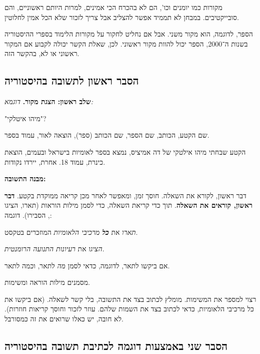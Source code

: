 \documentclass[a4paper]{book}
\begin{document}
	מקורות כמו יומנים וכו', הם לא בהכרח הכי אמינים, למרות היותם ראשוניים, והם סובייקטיבים. במבחן לא תממיד אפשר להצליב אבל צריך לזכור שלא הכל אמין לחלוטין. 
	
	הספר, לדוגמה, הוא מקור משני. אבל אם נחליט לחקור על מקורות הלימוד בספרי ההיסטוריה בשנות ה־2000, הספר יכול להוות מקור ראשוני. לכן, שאלת הקשר יכולה לקבוע אם המקור ראשוני או לא, בהקשר הזה. 
	
	\subsection{הסבר ראשון לתשובה בהיסטוריה}
	\textbf{שלב ראשון: הצגת מקור. }\textit{דוגמא: }
	
	"מיהו איטלקי"?
	
	שם הקטע, הכותב, שם הספר, שם הכותב (ספר), הוצאה לאור, עמוד בספר. 
	
	הקטע שבחתי מיהו אילטקי של דה אמיציס, נמצא בספר לאומיות בישראל ובעמים, הוצאת כינרת, עמוד 18. אחרת, יירדו נקודות. 
	
	\textbf{מבנה התשובה: }
	
	דבר ראשון, לקורא את השאלה. חוסך זמן, ומאפשר לאחר מכן קריאה ממוקדת בקטע. \textbf{דבר ראשון, קוראים את השאלה}. תוך כדי קריאת השאלה, כדי לסמן מילות הוראות (תארו, הציגו , הסבירו). דוגמה: 
	
	\textit{תארו} את \textit{\textbf{כל} מרכיבי הלאומיות} המוזכרים בטקסט. 
	
	\textit{הציגו} את \textit{רעיונות התנועה הרומנטית}. 
	
	אם ביקשו לתאר, לדוגמה, כדאי לסמן \textit{מה} לתאר, וכמה לתאר. 
	
	מסמנים מילות הוראה ומשימות. 
	
	רצוי למספר את המשימות. מומלץ לכתוב בצד את התשובה, בלי קשר לשאלה. (אם ביקשו את כל מרכיבי הלאומיות, כדאי לכתוב בצד את השמות שלהם. עוזר לזכור וחוסך קריאות חוזרות). לא חובה, יש כאלו שרואים את זה כמסורבל. 
	
	\subsection{הסבר שני באמצעות דוגמה לכתיבת תשובה בהיסטוריה}
	
\end{document}

